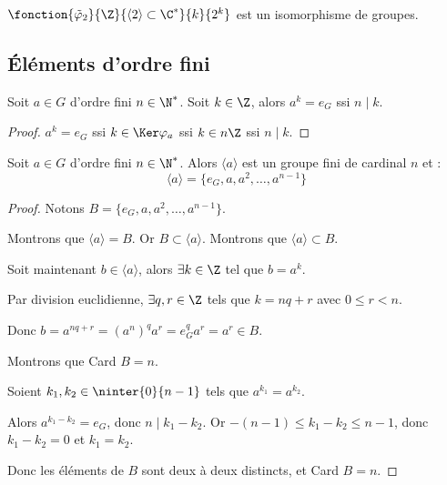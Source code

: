 \begin{exemple}
    $\fonction{\tilde \varphi_2}{\Z}{\langle 2 \rangle \subset \C^*}{k}{2^k}$ est un isomorphisme de groupes.

\end{exemple}

\subsection{Éléments d'ordre fini}

\begin{proposition}{}{}
    Soit $a \in G$ d'ordre fini $n \in \N^*$.
    Soit $k \in \Z$, alors
    $a^k = e_G$ ssi $n \mid k$.
\end{proposition}

\begin{proof}
    $a^k = e_G$ ssi $k \in \Ker \varphi_a$ ssi $k \in n \Z$ ssi $n \mid k$.
\end{proof}

\begin{proposition}{}{}
    Soit $a \in G$ d'ordre fini $n \in \N^*$.
    Alors $\langle a \rangle$ est un groupe fini de cardinal $n$ et :
    \[\langle a \rangle = \{e_G, a, a^2, \ldots, a^{n-1}\}\]
\end{proposition}


\begin{proof}
    Notons $B = \{e_G, a, a^2, \ldots, a^{n-1}\}$.

    Montrons que $\langle a \rangle = B$. 
    Or $B \subset \langle a \rangle$.
    Montrons que $\langle a \rangle \subset B$.

    Soit maintenant $b \in \langle a \rangle$, alors $\exists k \in \Z$ tel que $b = a^k$.

    Par division euclidienne, $\exists q, r \in \Z$ tels que $k = nq + r$ avec $0 \leqslant r < n$.

    Donc $b = a^{nq + r} = (a^n)^q a^r = e_G^q a^r = a^r \in B$.

    \avspace Montrons que Card $B = n$.

    Soient $k_1, k_2 \in \ninter{0}{n-1}$ tels que $a^{k_1} = a^{k_2}$.

    Alors $a^{k_1 - k_2} = e_G$, donc $n \mid k_1 - k_2$.
    Or $-(n-1) \leqslant k_1 - k_2 \leqslant n-1$, donc $k_1 - k_2 = 0$ et $k_1 = k_2$.

    Donc les éléments de $B$ sont deux à deux distincts, et Card $B = n$.
\end{proof}

